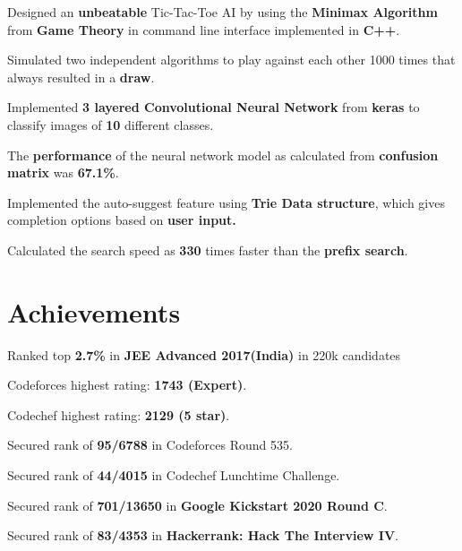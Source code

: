 \documentclass[]{deedy-resume-openfont}
\begin{document}
\begin{minipage}[t]{0.66\textwidth}
\begin{tightemize}
\item Designed an \textbf{unbeatable} Tic-Tac-Toe AI by using the  \textbf{Minimax Algorithm} from \textbf{Game Theory} in command line interface implemented in  \textbf{C++}.
\item Simulated two independent algorithms to play against each other 1000 times that always resulted in a \textbf{draw}.
\end{tightemize} 
\sectionsep

\begin{tightemize}
\item Implemented \textbf{3 layered Convolutional Neural Network} from \textbf{keras} to classify images of \textbf{10} different classes.
\item The \textbf{performance} of the neural network model as calculated from  \textbf{confusion matrix} was \textbf{67.1\%}.
\end{tightemize} 
\sectionsep

\begin{tightemize}
\item Implemented the auto-suggest feature using \textbf{Trie Data structure}, which gives completion options based on \textbf{user input.}
\item Calculated the search speed as \textbf{330} times faster than the  \textbf{prefix search}.
\end{tightemize} 
\sectionsep

\section{Achievements}
\runsubsection{}
\vspace{\topsep}
\begin{tightemize}
\item {Ranked top \textbf{2.7\%} in \textbf{JEE Advanced 2017(India)} in 220k candidates}
\item Codeforces highest rating: \textbf{1743 (Expert)}.
\item Codechef highest rating: \textbf{2129 (5 star)}.
\item Secured rank of \textbf{95/6788} in Codeforces Round 535.
\item Secured rank of \textbf{44/4015} in Codechef Lunchtime Challenge.
\item Secured rank of \textbf{701/13650} in \textbf{Google Kickstart 2020 Round C}.
\item Secured rank of \textbf{83/4353} in \textbf{Hackerrank: Hack The Interview IV}.
\end{tightemize} 
\sectionsep


\end{minipage}
\end{document}

